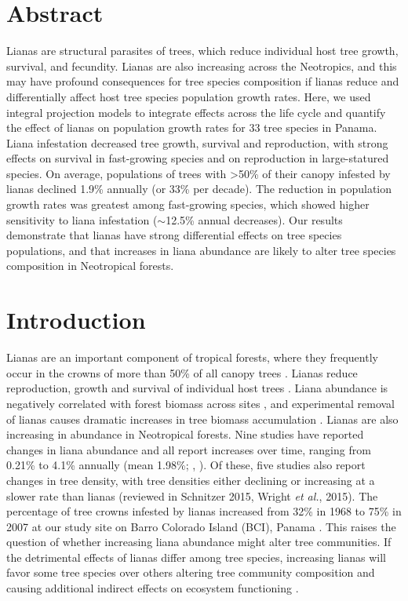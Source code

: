 \documentclass[b5paper,justified]{tufte-book} %
\begin{document}
\section{Abstract} 
\begin{fullwidth}
Lianas are structural parasites of trees, which reduce individual host tree growth, survival, and fecundity. Lianas are also increasing across the Neotropics, and this may have profound consequences for tree species composition if lianas reduce and differentially affect host tree species population growth rates. Here, we used integral projection models to integrate effects across the life cycle and quantify the effect of lianas on population growth rates for 33 tree species in Panama. Liana infestation decreased tree growth, survival and reproduction, with strong effects on survival in fast-growing species and on reproduction in large-statured species. On average, populations of trees with >50\% of their canopy infested by lianas declined 1.9\% annually (or 33\% per decade). The reduction in population growth rates was greatest among fast-growing species, which showed higher sensitivity to liana infestation ($\sim$12.5\% annual decreases). Our results demonstrate that lianas have strong differential effects on tree species populations, and that increases in liana abundance are likely to alter tree species composition in Neotropical forests. 

\section{Introduction}

Lianas are an important component of tropical forests, where they frequently occur in the crowns of more than 50\% of all canopy trees \citep{Putz1984a, Heijden2009, Ingwell2010}.  Lianas reduce reproduction, growth and survival of individual host trees \citep{Clark1990, Phillips2005, Wright2005, Wright2015, Pena-Claros2008, Ingwell2010, Schnitzer2010}. Liana abundance is negatively correlated with forest biomass across sites \citep{Duran2013}, and experimental removal of lianas causes dramatic increases in tree biomass accumulation \citep{Schnitzer2014, Heijden2015}. 	Lianas are also increasing in abundance in Neotropical forests. Nine studies have reported changes in liana abundance and all report increases over time, ranging from 0.21\% to 4.1\% annually (mean 1.98\%; \citealt{Schnitzer2014}, \citealt{Wright2015}). Of these, five studies also report changes in tree density, with tree densities either declining or increasing at a slower rate than lianas (reviewed in Schnitzer 2015, Wright \textit{et al.}, 2015). The percentage of tree crowns infested by lianas increased from 32\% in 1968 to 75\% in 2007 at our study site on Barro Colorado Island (BCI), Panama \citep{Ingwell2010}. This raises the question of whether increasing liana abundance might alter tree communities. If the detrimental effects of lianas differ among tree species, increasing lianas will favor some tree species over others altering tree community composition and causing additional indirect effects on ecosystem functioning \citep{Heijden2008, Schnitzer2011}. 


\end{fullwidth}
\end{document}
